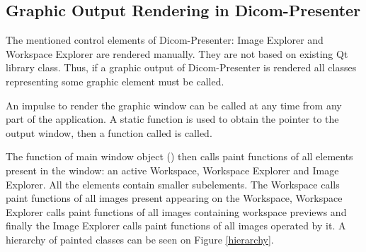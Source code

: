 \subsection{Graphic Output Rendering in Dicom-Presenter}
\label{renderingprocess}
The mentioned control elements of Dicom-Presenter: Image Explorer and Workspace Explorer are rendered manually. They are not based on existing Qt library class. Thus, if a graphic output of Dicom-Presenter is rendered all classes representing some graphic element must be called. 

An impulse to render the graphic window can be called at any time from any part of the application. A static function is used to obtain the pointer to the output window, then a function called  is called.

The  function of main window object () then calls paint functions of all elements present in the window: an active Workspace, Workspace Explorer and Image Explorer. All the elements contain smaller subelements. The Workspace calls paint functions of all images present appearing on the Workspace, Workspace Explorer calls paint functions of all images containing workspace previews and finally the Image Explorer calls paint functions of all images operated by it. A hierarchy of painted classes can be seen on Figure \ref{hierarchy}.

